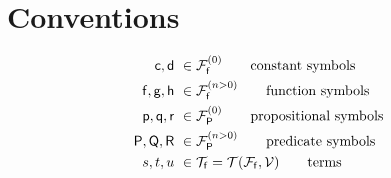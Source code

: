 


\section{Conventions}

\begin{align*}
\mc, \md &\ \in\mcFfn[{0}]\tag*{constant symbols} \\
\mf, \mg, \mh &\ \in\mcFfn[{n>0}]\tag*{function symbols} \\
\mpp, \mq, \mr &\ \in\mcFPn[{0}]\tag*{propositional symbols}\\
\mP, \mQ, \mR &\ \in\mcFPn[{n>0}]\tag*{predicate symbols}\\
s,t,u &\ \in\mcTf = \mcTFfV\tag*{terms}
\end{align*}


